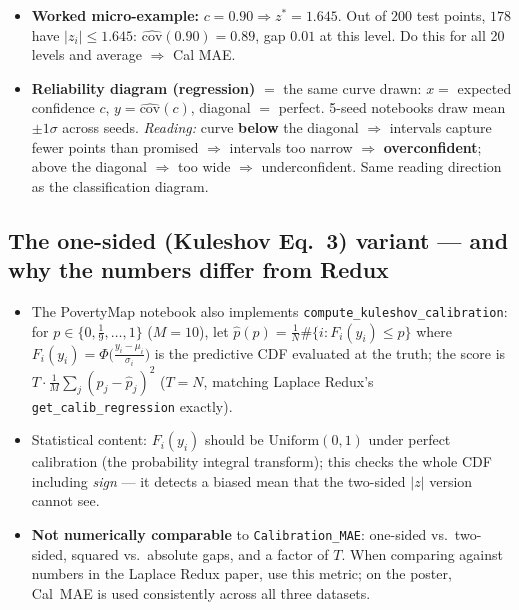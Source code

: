 \documentclass[10pt,a4paper]{article}
\newcommand{\code}[1]{\texttt{#1}}
\begin{document}
\begin{itemize}
\item \textbf{Worked micro-example:} $c=0.90\Rightarrow z^*=1.645$. Out of $200$ test points,
  $178$ have $|z_i|\le1.645$: $\widehat{\mathrm{cov}}(0.90)=0.89$, gap $0.01$ at this level. Do
  this for all 20 levels and average $\Rightarrow$ Cal MAE.
\item \textbf{Reliability diagram (regression)} $=$ the same curve drawn: $x=$ expected confidence
  $c$, $y=\widehat{\mathrm{cov}}(c)$, diagonal $=$ perfect. 5-seed notebooks draw mean
  $\pm1\sigma$ across seeds. \emph{Reading:} curve \textbf{below} the diagonal $\Rightarrow$
  intervals capture fewer points than promised $\Rightarrow$ intervals too narrow $\Rightarrow$
  \textbf{overconfident}; above the diagonal $\Rightarrow$ too wide $\Rightarrow$ underconfident.
  Same reading direction as the classification diagram.
\end{itemize}

\subsection{The one-sided (Kuleshov Eq.~3) variant --- and why the numbers differ from Redux}
\begin{itemize}
\item The PovertyMap notebook also implements \code{compute\_kuleshov\_calibration}: for
  $p\in\{0,\tfrac19,\dots,1\}$ ($M{=}10$), let $\hat p(p)=\frac1N\#\{i: F_i(y_i)\le p\}$ where
  $F_i(y_i)=\Phi\bigl(\frac{y_i-\mu_i}{\sigma_i}\bigr)$ is the predictive CDF evaluated at the
  truth; the score is $T\cdot\frac1M\sum_j(p_j-\hat p_j)^2$ ($T=N$, matching Laplace Redux's
  \code{get\_calib\_regression} exactly).
\item Statistical content: $F_i(y_i)$ should be $\mathrm{Uniform}(0,1)$ under perfect calibration
  (the probability integral transform); this checks the whole CDF including \emph{sign} ---
  it detects a biased mean that the two-sided $|z|$ version cannot see.
\item \textbf{Not numerically comparable} to \code{Calibration\_MAE}: one-sided vs.\ two-sided,
  squared vs.\ absolute gaps, and a factor of $T$. When comparing against numbers in the Laplace
  Redux paper, use this metric; on the poster, Cal~MAE is used consistently across all three
  datasets.
\end{itemize}
\end{document}
